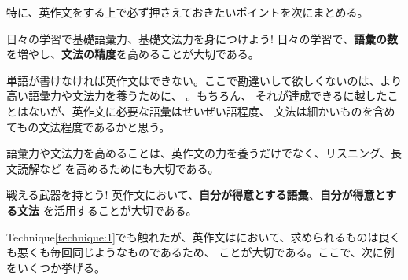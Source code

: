     特に、英作文をする上で必ず押さえておきたいポイントを次にまとめる。
\vspace{1em}

        \begin{techniquebox}{日々の学習で基礎語彙力、基礎文法力を身につけよう!}\label{technique:1}
            日々の学習で、\textbf{語彙の数}を増やし、\textbf{文法の精度}を高めることが大切である。
        \end{techniquebox}
\vspace{1em}

    単語が書けなければ英作文はできない。ここで勘違いして欲しくないのは、より高い語彙力や文法力を養うために、
    。もちろん、
    それが達成できるに越したことはないが、英作文に必要な語彙はせいぜい語程度、
    文法は細かいものを含めてもの文法程度であるかと思う。

    語彙力や文法力を高めることは、英作文の力を養うだけでなく、リスニング、長文読解など
    を高めるためにも大切である。
\newpage

        \begin{techniquebox}{戦える武器を持とう!}
            英作文において、\textbf{自分が得意とする語彙}、\textbf{自分が得意とする文法}
            を活用することが大切である。
        \end{techniquebox}
\vspace{1em}
    Technique\ref{technique:1}でも触れたが、英作文はにおいて、求められるものは良くも悪くも毎回同じようなものであるため、
    ことが大切である。ここで、次に例をいくつか挙げる。

